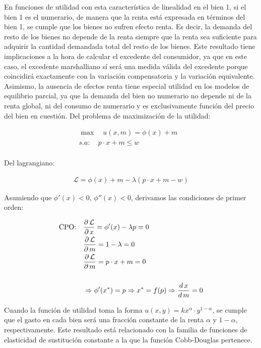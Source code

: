 \documentclass{nuevotema}
\begin{document}
En funciones de utilidad con esta característica de linealidad en el bien 1, si el bien 1 es el numerario, de manera que la renta está expresada en términos del bien 1, se cumple que los bienes no sufren efecto renta. Es decir, la demanda del resto de los bienes no depende de la renta siempre que la renta sea suficiente para adquirir la cantidad demandada total del resto de los bienes. Este resultado tiene implicaciones a la hora de calcular el excedente del consumidor, ya que en este caso, el excedente marshalliano sí será una medida válida del excedente porque coincidirá exactamente con la variación compensatoria y la variación equivalente. Asimismo, la ausencia de efectos renta tiene especial utilidad en los modelos de equilibrio parcial, ya que la demanda del bien no numerario no depende ni de la renta global, ni del consumo de numerario y es exclusivamente función del precio del bien en cuestión. Del problema de maximización de la utilidad:

\begin{align*}
	 \max \quad u(x,m) = \phi(x) + m & \\
	 s.a: \quad p \cdot x + m \leq w & \\
\end{align*}

Del lagrangiano:

\begin{align*}
	\mathcal{L} = \phi(x) + m - \lambda ( p \cdot x + m - w)
\end{align*}

Asumiendo que $\phi'(x) <0$, $\phi''(x) < 0$, derivamos las condiciones de primer orden:

\begin{align*}
	\text{CPO:} \quad & \dfrac{\partial \, \mathcal{L}}{\partial \, x} = \phi ' (x) - \lambda p = 0 \\
	& \dfrac{\partial \, \mathcal{L}}{\partial \, m} = 1 - \lambda = 0 \\
	& \dfrac{\partial \, \mathcal{L}}{\partial \, m} = p \cdot x + m = 0 \\ \\
	& \Rightarrow \phi'(x^*) = p \Rightarrow x^* = f(p) \Rightarrow \frac{d \, x}{d \, m} = 0 \\ 
\end{align*}



Cuando la función de utilidad toma la forma $u(x,y) =  k x^\alpha \cdot y^{1 - \alpha}$, se cumple que el gasto en cada bien será una fracción constante de la renta $\alpha$ y $1-\alpha$, respectivamente. Este resultado está relacionado con la familia de funciones de elasticidad de sustitución constante a la que la función Cobb-Douglas pertenece.
\end{document}
